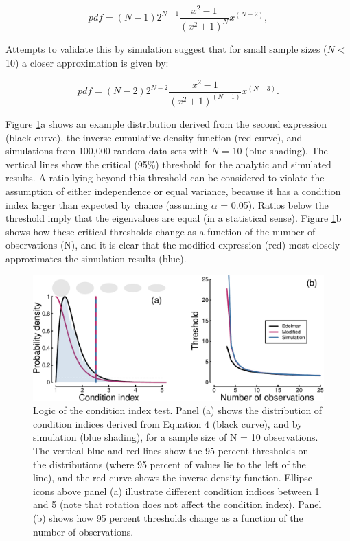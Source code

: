 \documentclass[]{article}
\begin{document}
\begin{equation}
\label{eq:edelman1}
pdf = (N-1)2^{N-1}\frac{x^2 - 1}{(x^2 + 1)^N}x^{(N-2)},
\end{equation}

Attempts to validate this by simulation suggest that for small sample sizes (\emph{N} \textless{} 10) a closer approximation is given by:

\begin{equation}
\label{eq:edelman2}
pdf = (N-2)2^{N-2}\frac{x^2 - 1}{(x^2 + 1)^{(N-1)}}x^{(N-3)}.
\end{equation}

Figure \ref{fig:distcomparison}a shows an example distribution derived from the second expression (black curve), the inverse cumulative density function (red curve), and simulations from 100,000 random data sets with \emph{N} = 10 (blue shading). The vertical lines show the critical (95\%) threshold for the analytic and simulated results. A ratio lying beyond this threshold can be considered to violate the assumption of either independence or equal variance, because it has a condition index larger than expected by chance (assuming \(\alpha\) = 0.05). Ratios below the threshold imply that the eigenvalues are equal (in a statistical sense). Figure \ref{fig:distcomparison}b shows how these critical thresholds change as a function of the number of observations (N), and it is clear that the modified expression (red) most closely approximates the simulation results (blue).

\begin{figure}

{\centering \includegraphics{manuscript_files/figure-latex/distcomparison-1} 

}

\caption{Logic of the condition index test. Panel (a) shows the distribution of condition indices derived from Equation 4 (black curve), and by simulation (blue shading), for a sample size of N = 10 observations. The vertical blue and red lines show the 95 percent thresholds on the distributions (where 95 percent of values lie to the left of the line), and the red curve shows the inverse density function. Ellipse icons above panel (a) illustrate different condition indices between 1 and 5 (note that rotation does not affect the condition index). Panel (b) shows how 95 percent thresholds change as a function of the number of observations.}\label{fig:distcomparison}
\end{figure}
\end{document}
